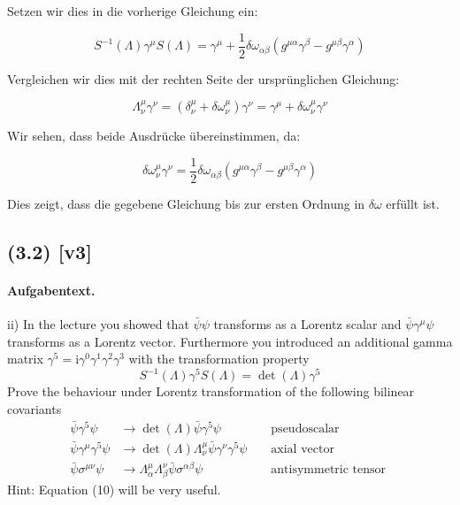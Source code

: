 \documentclass[11pt,a4paper]{article}
\begin{document}
Setzen wir dies in die vorherige Gleichung ein:

\[
S^{-1}(\Lambda) \gamma^\mu S(\Lambda) = \gamma^\mu + \frac{1}{2} \delta \omega_{\alpha\beta} (g^{\mu\alpha} \gamma^\beta - g^{\mu\beta} \gamma^\alpha)
\]

Vergleichen wir dies mit der rechten Seite der ursprünglichen Gleichung:

\[
\Lambda_\nu^\mu \gamma^\nu = (\delta^\mu_\nu + \delta \omega^\mu_\nu) \gamma^\nu = \gamma^\mu + \delta \omega^\mu_\nu \gamma^\nu
\]

Wir sehen, dass beide Ausdrücke übereinstimmen, da:

\[
\delta \omega^\mu_\nu \gamma^\nu = \frac{1}{2} \delta \omega_{\alpha\beta} (g^{\mu\alpha} \gamma^\beta - g^{\mu\beta} \gamma^\alpha)
\]

Dies zeigt, dass die gegebene Gleichung bis zur ersten Ordnung in $\delta \omega$ erfüllt ist.


\subsection*{(3.2) [v3]}
\paragraph{Aufgabentext.}
ii) In the lecture you showed that $\bar{\psi} \psi$ transforms as a Lorentz scalar and $\bar{\psi} \gamma^\mu \psi$ transforms as a Lorentz vector. Furthermore you introduced an additional gamma matrix $\gamma^5=\mathrm{i} \gamma^0 \gamma^1 \gamma^2 \gamma^3$ with the transformation property
$$
S^{-1}(\Lambda) \gamma^5 S(\Lambda)=\operatorname{det}(\Lambda) \gamma^5
$$
Prove the behaviour under Lorentz transformation of the following bilinear covariants
$$
\begin{aligned}
\bar{\psi} \gamma^5 \psi & \rightarrow \operatorname{det}(\Lambda) \bar{\psi} \gamma^5 \psi & & \text { pseudoscalar } \\
\bar{\psi} \gamma^\mu \gamma^5 \psi & \rightarrow \operatorname{det}(\Lambda) \Lambda_\nu^\mu \bar{\psi} \gamma^\nu \gamma^5 \psi & & \text { axial vector } \\
\bar{\psi} \sigma^{\mu \nu} \psi & \rightarrow \Lambda_\alpha^\mu \Lambda_\beta^\nu \bar{\psi} \sigma^{\alpha \beta} \psi & & \text { antisymmetric tensor }
\end{aligned}
$$
Hint: Equation (10) will be very useful.
\end{document}
